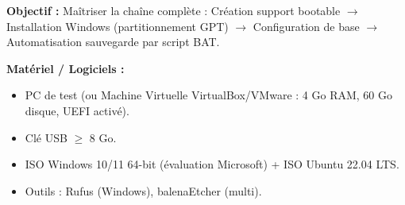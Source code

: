 \documentclass[11pt]{article}
\begin{document}
\begin{experience}
\textbf{Objectif :} Maîtriser la chaîne complète : Création support bootable $\rightarrow$ Installation Windows (partitionnement GPT) $\rightarrow$ Configuration de base $\rightarrow$ Automatisation sauvegarde par script BAT.

\textbf{Matériel / Logiciels :}
\begin{itemize}
  \item PC de test (ou Machine Virtuelle VirtualBox/VMware : 4 Go RAM, 60 Go disque, UEFI activé).
  \item Clé USB $\ge$ 8 Go.
  \item ISO Windows 10/11 64-bit (évaluation Microsoft) + ISO Ubuntu 22.04 LTS.
  \item Outils : Rufus (Windows), balenaEtcher (multi).
\end{itemize}


\end{experience}
\end{document}
